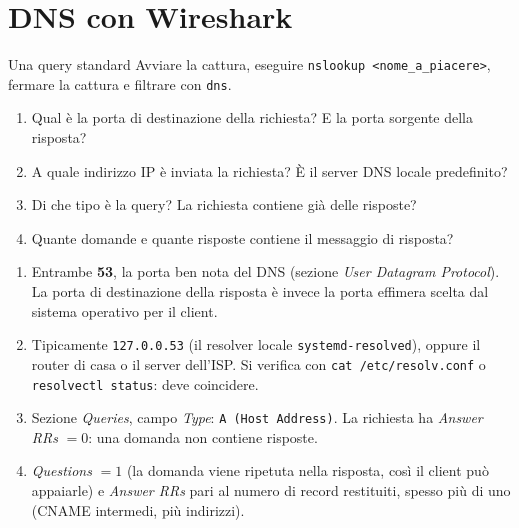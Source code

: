 \section{DNS con Wireshark}

\begin{esercizio}{Una query standard}
Avviare la cattura, eseguire \texttt{nslookup <nome\_a\_piacere>}, fermare la cattura e filtrare con \texttt{dns}.
\begin{enumerate}[label=(\alph*)]
    \item Qual è la porta di destinazione della richiesta? E la porta sorgente della risposta?
    \item A quale indirizzo IP è inviata la richiesta? È il server DNS locale predefinito?
    \item Di che tipo è la query? La richiesta contiene già delle risposte?
    \item Quante domande e quante risposte contiene il messaggio di risposta?
\end{enumerate}
\end{esercizio}

\svolgimento
\begin{enumerate}[label=(\alph*)]
    \item Entrambe \textbf{53}, la porta ben nota del DNS (sezione \emph{User Datagram Protocol}). La porta di destinazione della
          risposta è invece la porta effimera scelta dal sistema operativo per il client.
    \item Tipicamente \texttt{127.0.0.53} (il resolver locale \texttt{systemd-resolved}), oppure il router di casa o il server
          dell'ISP. Si verifica con \texttt{cat /etc/resolv.conf} o \texttt{resolvectl status}: deve coincidere.
    \item Sezione \emph{Queries}, campo \emph{Type}: \texttt{A (Host Address)}. La richiesta ha \emph{Answer RRs} $= 0$: una
          domanda non contiene risposte.
    \item \emph{Questions} $= 1$ (la domanda viene ripetuta nella risposta, così il client può appaiarle) e \emph{Answer RRs}
          pari al numero di record restituiti, spesso più di uno (CNAME intermedi, più indirizzi).
\end{enumerate}


